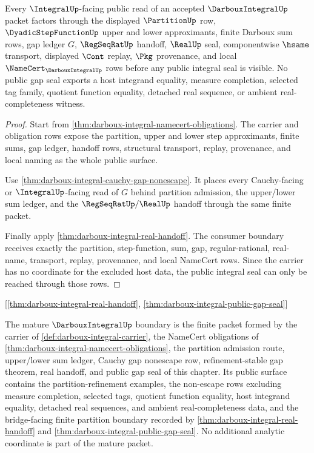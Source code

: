 \begin{theorem}
\label{thm:darboux-integral-public-gap-seal}
Every $\IntegralUp$-facing public read of an accepted $\DarbouxIntegralUp$ packet factors through the displayed $\PartitionUp$ row, $\DyadicStepFunctionUp$ upper and lower approximants, finite Darboux sum rows, gap ledger $G$, $\RegSeqRatUp$ handoff, $\RealUp$ seal, componentwise $\hsame$ transport, displayed $\Cont$ replay, $\Pkg$ provenance, and local $\NameCert_{\DarbouxIntegralUp}$ rows before any public integral seal is visible. No public gap seal exports a host integrand equality, measure completion, selected tag family, quotient function equality, detached real sequence, or ambient real-completeness witness.
\end{theorem}
\begin{proof}
Start from \autoref{thm:darboux-integral-namecert-obligations}. The carrier and obligation rows expose the partition, upper and lower step approximants, finite sums, gap ledger, handoff rows, structural transport, replay, provenance, and local naming as the whole public surface.

Use \autoref{thm:darboux-integral-cauchy-gap-nonescape}. It places every Cauchy-facing or $\IntegralUp$-facing read of $G$ behind partition admission, the upper/lower sum ledger, and the $\RegSeqRatUp/\RealUp$ handoff through the same finite packet.

Finally apply \autoref{thm:darboux-integral-real-handoff}. The consumer boundary receives exactly the partition, step-function, sum, gap, regular-rational, real-name, transport, replay, provenance, and local NameCert rows. Since the carrier has no coordinate for the excluded host data, the public integral seal can only be reached through those rows.
\end{proof}

[\autoref{thm:darboux-integral-real-handoff}, \autoref{thm:darboux-integral-public-gap-seal}]

\begin{definition}
\label{def:darboux-integral-mature-boundary}
The mature $\DarbouxIntegralUp$ boundary is the finite packet formed by the carrier of \autoref{def:darboux-integral-carrier}, the NameCert obligations of \autoref{thm:darboux-integral-namecert-obligations}, the partition admission route, upper/lower sum ledger, Cauchy gap nonescape row, refinement-stable gap theorem, real handoff, and public gap seal of this chapter. Its public surface contains the partition-refinement examples, the non-escape rows excluding measure completion, selected tags, quotient function equality, host integrand equality, detached real sequences, and ambient real-completeness data, and the bridge-facing finite partition boundary recorded by \autoref{thm:darboux-integral-real-handoff} and \autoref{thm:darboux-integral-public-gap-seal}. No additional analytic coordinate is part of the mature packet.
\end{definition}

